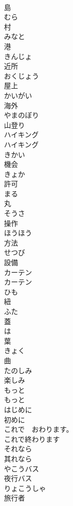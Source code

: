 \documentclass[8pt]{extreport}
\begin{document}
\begin{CJK}{UTF8}{min}
\\	島	
\\	むら	
\\	村		
\\	みなと	
\\	港		
\\	きんじょ	
\\	近所		
\\	おくじょう	
\\	屋上		
\\	かいがい	
\\	海外		
\\	やまのぼり	
\\	山登り		
\\	ハイキング	
\\	ハイキング		
\\	きかい	
\\	機会	
\\	きょか	
\\	許可	
\\	まる	
\\	丸		
\\	そうさ	
\\	操作	
\\	ほうほう	
\\	方法	
\\	せつび	
\\	設備		
\\	カーテン	
\\	カーテン	
\\	ひも	
\\	紐	
\\	ふた	
\\	蓋		
\\	は	
\\	葉		
\\	きょく	
\\	曲		
\\	たのしみ	
\\	楽しみ	
\\	もっと	
\\	もっと	
\\	はじめに	
\\	初めに		
\\	これで　おわります。	
\\	これで終わります		
\\	それなら	
\\	其れなら		
\\	やこうバス	
\\	夜行バス		
\\	りょこうしゃ	
\\	旅行者		

\end{CJK}
\end{document}
